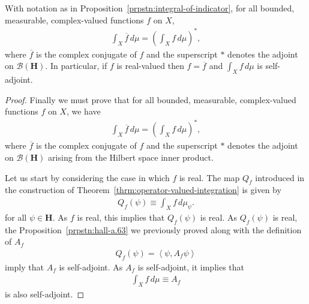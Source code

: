 \begin{proposition}
    \label{prpstn:integral-conjugation}
    \leanok
    With notation as in Proposition~\ref{prpstn:integral-of-indicator}, for all bounded, measurable, complex-valued functions $f$ on $X$,
    \begin{align}
        \int_X \overline{f} \, d\mu = \left( \int_X f \, d\mu \right)^*,
    \end{align}
    where $\overline{f}$ is the complex conjugate of $f$ and the superscript $*$ denotes the adjoint on $\mathcal{B}(\mathbf{H})$. In particular, if $f$ is real-valued then $f = \overline{f}$ and $\int_X f \, d\mu$ is self-adjoint.
\end{proposition}
\begin{proof}
    \leanok
Finally we must prove that for all bounded, measurable, complex-valued functions $f$ on $X$, we have
\begin{align}
    \int_X \overline{f} \, d\mu = \left( \int_X f \, d\mu \right)^*,
\end{align}
where $\overline{f}$ is the complex conjugate of $f$ and the superscript $*$ denotes the adjoint on $\mathcal{B}(\mathbf{H})$ arising from the Hilbert space inner product.

Let us start by considering the case in which $f$ is real. The map $Q_f$ introduced in the construction of Theorem~\ref{thrm:operator-valued-integration} is given by
\begin{align}
    Q_f(\psi) \equiv \int_X f \, d\mu_\psi.
\end{align}
for all $\psi \in \mathbf{H}$. As $f$ is real, this implies that $Q_f(\psi)$ is real. As $Q_f(\psi)$ is real, the Proposition~\ref{prpstn:hall-a.63} we previously proved along with the definition of $A_f$
\begin{align}
    Q_f(\psi) = \left< \psi, A_f \psi \right>
\end{align}
imply that $A_f$ is self-adjoint. As $A_f$ is self-adjoint, it implies that
\begin{align}
    \int_X f \, d\mu \equiv A_f
\end{align}
is also self-adjoint.


\end{proof}
